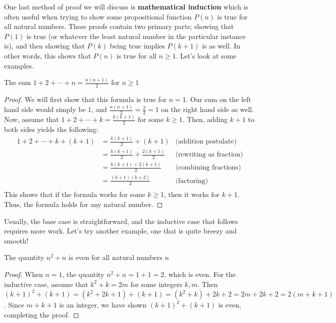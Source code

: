 One last method of proof we will discuss is \textbf{mathematical induction} which is often useful when trying to show some propositional function $P(n)$ is true for all natural numbers. These proofs contain two primary parts; showing that $P(1)$ is true (or whatever the least natural number in the particular instance is), and then showing that $P(k)$ being true implies $P(k+1)$ is as well. In other words, this shows that $P(n)$ is true for all $n\geq 1$. Let's look at some examples. 

\begin{theorem}
    The sum $1+2+\cdots +n=\frac{n(n+1)}{2}$ for $n\geq 1$
\end{theorem}
\begin{proof}
    We will first show that this formula is true for $n=1$. Our sum on the left hand side would simply be $1$, and $\frac{n(n+1)}{2}=\frac{2}{2}=1$ on the right hand side as well. Now, assume that $1+2+\cdots +k=\frac{k(k+1)}{2}$ for some $k\geq 1$. Then, adding $k+1$ to both sides yields the following:
    \begin{align*}
       1+2+\cdots +k+(k+1)&=\frac{k(k+1)}{2}+(k+1) &\text{(addition postulate)} \\
         &=\frac{k(k+1)}{2} +\frac{2(k+1)}{2} &\text{(rewriting as fraction)}\\
         &=\frac{k(k+1)+2(k+1)}{2}  &\text{(combining fractions)}\\
         &=\frac{(k+1)(k+2)}{2}  &\text{(factoring)}\\
    \end{align*}
    This shows that if the formula works for some $k\geq 1$, then it works for $k+1$. Thus, the formula holds for any natural number. 
\end{proof}

Usually, the base case is straightforward, and the inductive case that follows requires more work. Let's try another example, one that is quite breezy and smooth!


\begin{theorem}
    The quantity $n^2+n$ is even for all natural numbers $n$
\end{theorem}
\vspace{-5mm}
\begin{proof}
    When $n=1$, the quantity $n^2+n=1+1=2$, which is even. For the inductive case, assume that $k^2+k=2m$ for some integers $k,m$. Then $(k+1)^2+(k+1) = (k^2 + 2k + 1) + (k+1) = (k^2+k)+2k+2 = 2m +2k+2 = 2(m+k+1)$. Since $m+k+1$ is an integer, we have shown $(k+1)^2+(k+1)$ is even, completing the proof.
\end{proof}

